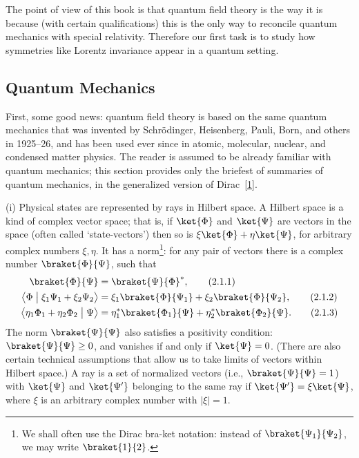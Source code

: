 
The point of view of this book is that quantum field theory is the way
it is because (with certain qualifications) this is the only way to reconcile
quantum mechanics with special relativity. Therefore our first task is
to study how symmetries like Lorentz invariance appear in a quantum
setting.

\subsection{Quantum Mechanics}

First, some good news: quantum field theory is based on the same
quantum mechanics that was invented by Schr\"odinger, Heisenberg, Pauli,
Born, and others in 1925--26, and has been used ever since in atomic,
molecular, nuclear, and condensed matter physics. The reader is assumed
to be already familiar with quantum mechanics; this section provides
only the briefest of summaries of quantum mechanics, in the generalized
version of Dirac~\hyperref[ref:2.1]{[1]}.

\noindent
(i) Physical states are represented by rays in Hilbert space. A Hilbert
space is a kind of complex vector space; that is, if $\ket{\Phi}$ and
$\ket{\Psi}$ are vectors in the space (often called `state-vectors') then
so is $\xi\ket{\Phi}+\eta\ket{\Psi}$, for arbitrary complex numbers
$\xi,\eta$. It has a norm\footnote{We shall often use the Dirac bra-ket
notation: instead of $\braket{\Psi_1}{\Psi_2}$, we may write
$\braket{1}{2}$.}: for any pair of
vectors there is a complex
number $\braket{\Phi}{\Psi}$, such that
\begin{align}
  \braket{\Phi}{\Psi} &= \braket{\Psi}{\Phi}^{*},
  \tag{2.1.1}\label{eq:2.1.1}\\
  \bigl\langle \Phi \bigm| \xi_1\Psi_1+\xi_2\Psi_2\bigr\rangle
    &= \xi_1\braket{\Phi}{\Psi_1}+\xi_2\braket{\Phi}{\Psi_2},
  \tag{2.1.2}\label{eq:2.1.2}\\
  \bigl\langle \eta_1\Phi_1+\eta_2\Phi_2 \bigm| \Psi\bigr\rangle
    &= \eta_1^{*}\braket{\Phi_1}{\Psi}
      +\eta_2^{*}\braket{\Phi_2}{\Psi}.
  \tag{2.1.3}\label{eq:2.1.3}
\end{align}
The norm $\braket{\Psi}{\Psi}$ also satisfies a positivity condition:
$\braket{\Psi}{\Psi}\geq 0$, and vanishes if and only if
$\ket{\Psi}=0$. (There are also certain technical assumptions that allow
us to take limits of vectors within Hilbert space.) A ray is a set of
normalized vectors (i.e., $\braket{\Psi}{\Psi}=1$) with $\ket{\Psi}$ and
$\ket{\Psi'}$ belonging to the same ray if
$\ket{\Psi'}=\xi\ket{\Psi}$, where $\xi$ is an arbitrary complex number
with $|\xi|=1$.


